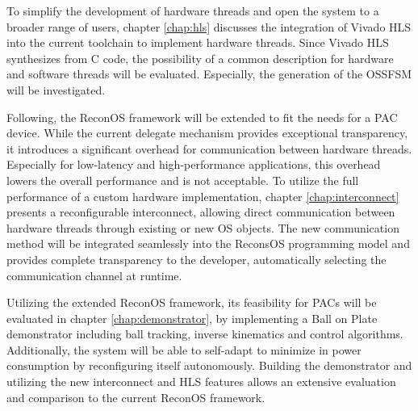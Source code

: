 To simplify the development of hardware threads and open the system to a
broader range of users, chapter \ref{chap:hls} discusses the integration of
Vivado HLS into the current toolchain to implement hardware threads. Since
Vivado HLS synthesizes from C code, the possibility of a common description
for hardware and software threads will be evaluated. Especially, the
generation of the \ac{OSSFSM} will be investigated.

Following, the ReconOS framework will be extended to fit the needs for a
\ac{PAC} device. While the current delegate mechanism provides exceptional
transparency, it introduces a significant overhead for communication between
hardware threads. Especially for low-latency and high-performance
applications, this overhead lowers the overall performance and is not
acceptable. To utilize the full performance of a custom hardware
implementation, chapter \ref{chap:interconnect} presents a reconfigurable
interconnect, allowing direct communication between hardware threads through
existing or new \ac{OS} objects. The new communication method will be
integrated seamlessly into the ReconsOS programming model and provides
complete transparency to the developer, automatically selecting the
communication channel at runtime.

Utilizing the extended ReconOS framework, its feasibility for \acp{PAC} will
be evaluated in chapter \ref{chap:demonstrator}, by implementing a Ball on
Plate demonstrator including ball tracking, inverse kinematics and control
algorithms. Additionally, the system will be able to self-adapt to minimize in
power consumption by reconfiguring itself autonomously. Building the
demonstrator and utilizing the new interconnect and \ac{HLS} features allows
an extensive evaluation and comparison to the current ReconOS framework.